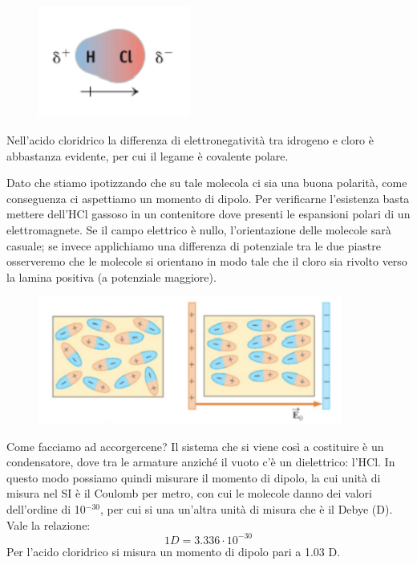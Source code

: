 \vspace{-0.4cm}\begin{figure}[htp]
    \centering
    \includegraphics[width=5cm]{immagini/HCl.png}
\end{figure}

\vspace{-0.4cm}Nell'acido cloridrico la differenza di elettronegatività tra idrogeno e cloro è abbastanza evidente, per cui il legame è covalente polare.

Dato che stiamo ipotizzando che su tale molecola ci sia una buona polarità, come conseguenza ci aspettiamo un momento di dipolo.
Per verificarne l'esistenza basta mettere dell'HCl gassoso in un contenitore dove presenti le espansioni polari di un elettromagnete. Se il campo elettrico è nullo, l'orientazione delle molecole sarà casuale; se invece applichiamo una differenza di potenziale tra le due piastre osserveremo che le molecole si orientano in modo tale che il cloro sia rivolto verso la lamina positiva (a potenziale maggiore).
\begin{figure}[htp]
    \centering
    \includegraphics[width=10cm]{immagini/condensatore.png}
\end{figure}
Come facciamo ad accorgercene?
Il sistema che si viene così a costituire è un condensatore, dove tra le armature anziché il vuoto c'è un dielettrico: l'HCl. In questo modo possiamo quindi misurare il momento di dipolo, la cui unità di misura nel SI è il Coulomb per metro, con cui le molecole danno dei valori dell'ordine di 10$^{-30}$, per cui si una un'altra unità di misura che è il Debye (D). Vale la relazione:
$$1D=3.336\cdot10^{-30}$$
Per l'acido cloridrico si misura un momento di dipolo pari a 1.03 D.

